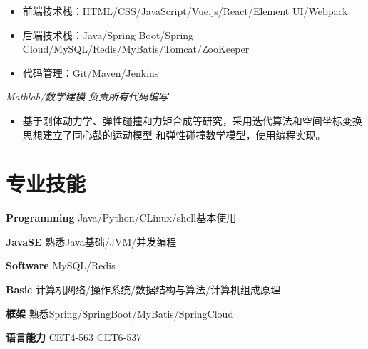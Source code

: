 \documentclass{uniquecv}
\begin{document}
{\it }
\vspace{0.4ex}
\begin{itemize}
  \item 前端技术栈：HTML/CSS/JavaScript/Vue.js/React/Element UI/Webpack
  \item 后端技术栈：Java/Spring Boot/Spring Cloud/MySQL/Redis/MyBatis/Tomcat/ZooKeeper
  \item 代码管理：Git/Maven/Jenkins
\end{itemize}

{\it Matblab/数学建模}
\quad \emph{负责所有代码编写}
\vspace{0.4ex}
\begin{itemize}
  \item 基于刚体动力学、弹性碰撞和力矩合成等研究，采用迭代算法和空间坐标变换思想建立了同心鼓的运动模型
和弹性碰撞数学模型，使用编程实现。
\end{itemize}
\vspace{0.4ex}


\section{专业技能}
\smallskip
\textbf{Programming}
\quad Java/Python/C\quad Linux/shell基本使用

\textbf{JavaSE} 
\quad 熟悉Java基础/JVM/并发编程

\textbf{Software} 
\quad MySQL/Redis

\textbf{Basic} 
\quad 计算机网络/操作系统/数据结构与算法/计算机组成原理

\textbf{框架} 
\quad 熟悉Spring/SpringBoot/MyBatis/SpringCloud

\textbf{语言能力} 
\quad CET4-563 \quad CET6-537
\end{document}
